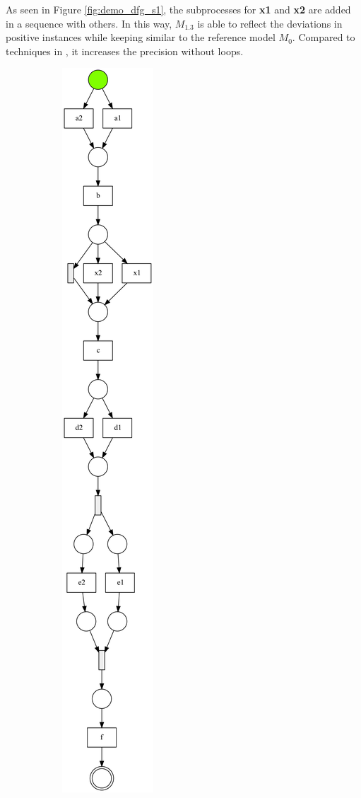 As seen in Figure \ref{fig:demo_dfg_s1}, the subprocesses for \textbf{x1} and \textbf{x2} are added in a sequence with others. In this way, $M_{1.3}$ is able to reflect the deviations in positive instances while keeping similar to the reference model $M_0$. Compared to techniques in \cite{fahland2015model}, it increases the precision without loops.
\begin{figure}[htp]
	\centering
	\begin{subfigure}[b]{0.31\textwidth}
		\centering
		\includegraphics[width=0.75\linewidth, height=0.8\textheight]{figures/evaluation/PN-result-demo-s1-dfg.pdf}

\end{subfigure}
\end{figure}
